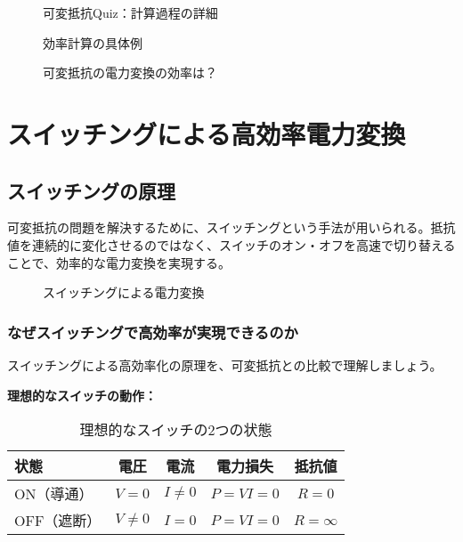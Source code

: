 \begin{figure}[H]
\centering
{}
\caption{可変抵抗Quiz：計算過程の詳細}
\label{fig:resistor_calculation}
\end{figure}

\begin{figure}[H]
\centering
{}
\caption{効率計算の具体例}
\label{fig:efficiency_calculation}
\end{figure}

\begin{figure}[H]
\centering
{}
\caption{可変抵抗の電力変換の効率は？}
\label{fig:resistor_efficiency}
\end{figure}

\section{スイッチングによる高効率電力変換}

\subsection{スイッチングの原理}

可変抵抗の問題を解決するために、スイッチングという手法が用いられる。抵抗値を連続的に変化させるのではなく、スイッチのオン・オフを高速で切り替えることで、効率的な電力変換を実現する。

\begin{figure}[H]
\centering
{}
\caption{スイッチングによる電力変換}
\label{fig:switching}
\end{figure}

\subsubsection{なぜスイッチングで高効率が実現できるのか}

スイッチングによる高効率化の原理を、可変抵抗との比較で理解しましょう。

\textbf{理想的なスイッチの動作：}

\begin{table}[H]
\centering
\caption{理想的なスイッチの2つの状態}
\begin{tabular}{|l|c|c|c|c|}
\hline
\textbf{状態} & \textbf{電圧} & \textbf{電流} & \textbf{電力損失} & \textbf{抵抗値} \\
\hline
\hline
ON（導通） & $V = 0$ & $I \neq 0$ & $P = VI = 0$ & $R = 0$ \\
\hline
OFF（遮断） & $V \neq 0$ & $I = 0$ & $P = VI = 0$ & $R = \infty$ \\
\hline
\end{tabular}
\end{table}

